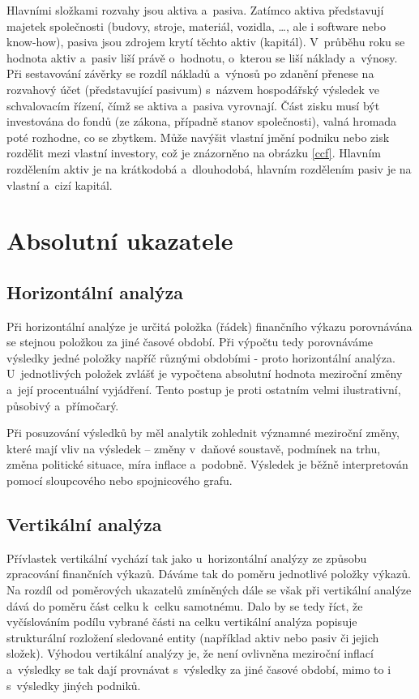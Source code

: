Hlavními složkami rozvahy jsou aktiva a~pasiva. Zatímco aktiva představují majetek společnosti (budovy, stroje, materiál, vozidla, \dots, ale i software nebo know-how), pasiva jsou zdrojem krytí těchto aktiv (kapitál). V~průběhu roku se hodnota aktiv a~pasiv liší právě o~hodnotu, o~kterou se liší náklady a~výnosy. Při sestavování závěrky se rozdíl nákladů a~výnosů po zdanění přenese na rozvahový účet (představující pasivum) s~názvem hospodářský výsledek ve schvalovacím řízení, čímž se aktiva a~pasiva vyrovnají. Část zisku musí být investována do fondů (ze zákona, případně stanov společnosti), valná hromada poté rozhodne, co se zbytkem. Může navýšit vlastní jmění podniku nebo zisk rozdělit mezi vlastní investory, což je znázorněno na obrázku \ref{ccf}. Hlavním rozdělením aktiv je na krátkodobá a~dlouhodobá, hlavním rozdělením pasiv je na vlastní a~cizí kapitál.





\section{Absolutní ukazatele}

\subsection{Horizontální analýza}
Při horizontální analýze je určitá položka (řádek) finančního výkazu porovnávána se stejnou položkou za jiné časové období. Při výpočtu tedy porovnáváme výsledky jedné položky napříč různými obdobími - proto horizontální analýza. U~jednotlivých položek zvlášť je vypočtena absolutní hodnota meziroční změny a~její procentuální vyjádření. Tento postup je proti ostatním velmi ilustrativní, působivý a~přímočarý. 

Při posuzování výsledků by měl analytik zohlednit významné meziroční změny, které mají vliv na výsledek -- změny v~daňové soustavě, podmínek na trhu, změna politické situace, míra inflace a~podobně. Výsledek je běžně interpretován pomocí sloupcového nebo spojnicového grafu. 


\subsection{Vertikální analýza}
Přívlastek vertikální vychází tak jako u~horizontální analýzy ze způsobu zpracování finančních výkazů. Dáváme tak do poměru jednotlivé položky výkazů. Na rozdíl od poměrových ukazatelů zmíněných dále se však při vertikální analýze dává do poměru část celku k~celku samotnému. Dalo by se tedy říct, že vyčíslováním podílu vybrané části na celku vertikální analýza popisuje strukturální rozložení sledované entity (například aktiv nebo pasiv či jejich složek). 
Výhodou vertikální analýzy je, že není ovlivněna meziroční inflací a~výsledky se tak dají provnávat s~výsledky za jiné časové období, mimo to i s~výsledky jiných podniků\cite{sedl}.






